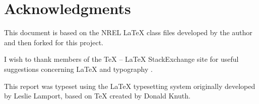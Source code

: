 \chapter*{Acknowledgments}
This document  is based on the NREL LaTeX class files developed by the author and then forked for this project.

I wish to thank members of the TeX -- LaTeX StackExchange site for useful suggestions concerning LaTeX and typography \citep{texstackexchange}.

This report was typeset using the LaTeX typesetting system originally developed by Leslie Lamport, based on TeX created by Donald Knuth.